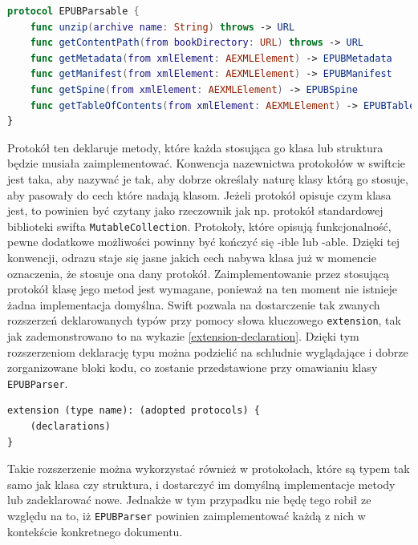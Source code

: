 \begin{lstlisting}[caption={Protokół EPUBParsable}, language=swift,label=EPUBParsable-declaration]
protocol EPUBParsable {
    func unzip(archive name: String) throws -> URL
    func getContentPath(from bookDirectory: URL) throws -> URL
    func getMetadata(from xmlElement: AEXMLElement) -> EPUBMetadata
    func getManifest(from xmlElement: AEXMLElement) -> EPUBManifest
    func getSpine(from xmlElement: AEXMLElement) -> EPUBSpine
    func getTableOfContents(from xmlElement: AEXMLElement) -> EPUBTableOfContents
}
\end{lstlisting}

Protokół ten deklaruje metody, które każda stosująca go klasa lub struktura będzie musiała zaimplementować. Konwencja nazewnictwa protokołów w swiftcie jest taka, aby nazywać je tak, aby dobrze określały naturę klasy którą go stosuje, aby pasowały do cech które nadają klasom. Jeżeli protokół opisuje czym klasa jest, to powinien być czytany jako rzeczownik jak np. protokół standardowej biblioteki swifta \texttt{MutableCollection}. Protokoły, które opisują funkcjonalność, pewne dodatkowe możliwości powinny być kończyć się -ible lub -able. Dzięki tej konwencji, odrazu staje się jasne jakich cech nabywa klasa już w momencie oznaczenia, że stosuje ona dany protokół. Zaimplementowanie przez stosującą protokół klasę jego metod jest wymagane, ponieważ na ten moment nie istnieje żadna implementacja domyślna. Swift pozwala na dostarczenie tak zwanych rozszerzeń deklarowanych typów przy pomocy słowa kluczowego \texttt{extension}, tak jak zademonstrowano to na wykazie \ref{extension-declaration}. Dzięki tym rozszerzeniom deklarację typu można podzielić na schludnie wyglądające i dobrze zorganizowane bloki kodu, co zostanie przedstawione przy omawianiu klasy \texttt{EPUBParser}.

\begin{lstlisting}[caption={Deklaracja wyrażenia \texttt{extension}\cite{theSwiftProgrammingLanguage}},language=swift-reference,label=extension-declaration]
extension (type name): (adopted protocols) {
    (declarations)
}
\end{lstlisting}

Takie rozszerzenie można wykorzystać również w protokołach, które są typem tak samo jak klasa czy struktura, i dostarczyć im domyślną implementacje metody lub zadeklarować nowe. Jednakże w tym przypadku nie będę tego robił ze względu na to, iż \texttt{EPUBParser} powinien zaimplementować każdą z nich w kontekście konkretnego dokumentu.

